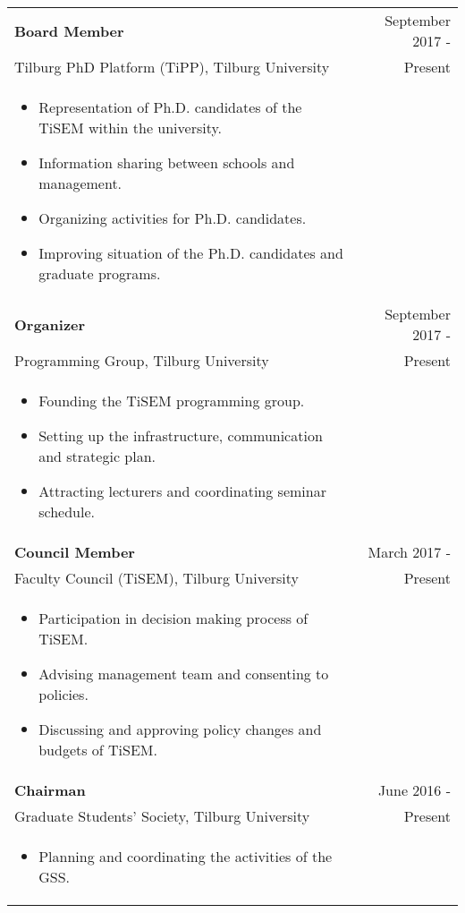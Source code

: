 \documentclass[a4paper,10pt]{article} %
\begin{document}
\begin{tabular}{p{12cm} r}
	\textbf{Board Member}  &September 2017 -\\
	Tilburg PhD Platform (TiPP), {Tilburg University} & Present\phantom{ -}\\
	\begin{itemize}[noitemsep]
		\item Representation of Ph.D. candidates of the TiSEM within the university.
		\item Information sharing between schools and management.
		\item Organizing activities for Ph.D. candidates.
		\item Improving situation of the Ph.D. candidates and graduate programs.
	\end{itemize}&\\
	\textbf{Organizer}  &September 2017 -\\
	Programming Group, {Tilburg University} & Present\phantom{ -}\\
	\begin{itemize}[noitemsep]
		\item Founding the TiSEM programming group.
		\item Setting up the infrastructure, communication and strategic plan.
		\item Attracting lecturers and coordinating seminar schedule.
	\end{itemize}&\\
	\textbf{Council Member}  &March 2017 -\\
	Faculty Council (TiSEM), {Tilburg University} & Present\phantom{ -}\\
	\begin{itemize}[noitemsep]
		\item Participation in decision making process of TiSEM.
		\item Advising management team and consenting to policies.
		\item Discussing and approving policy changes and budgets of TiSEM.
	\end{itemize}&\\
	\textbf{Chairman}  &June 2016 -\\
	Graduate Students' Society, {Tilburg University} & Present\phantom{ -}\\
	\begin{itemize}[noitemsep]
		\item Planning and coordinating the activities of the GSS.

\end{itemize}
\end{tabular}
\end{document}
